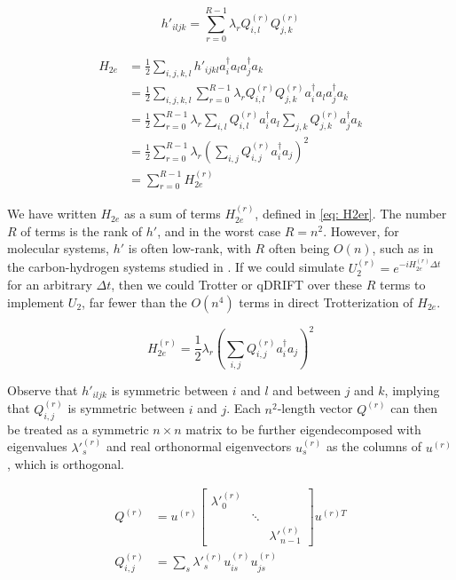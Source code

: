 \begin{equation}
    h'_{iljk} = \sum_{r = 0}^{R - 1} \lambda_r Q^{(r)}_{i, l}Q^{(r)}_{j, k}
\end{equation}

\begin{equation}
    \begin{split}
        H_{2e} &= \frac{1}{2}\sum_{i,j,k,l} h'_{ijkl}a^\dag_ia_la^\dag_ja_k \\
        &= \frac{1}{2}\sum_{i,j,k,l} \sum_{r = 0}^{R - 1} \lambda_r Q^{(r)}_{i, l}Q^{(r)}_{j, k}a^\dag_ia_la^\dag_ja_k \\
        &= \frac{1}{2}\sum_{r = 0}^{R - 1} \lambda_r \sum_{i,l} Q^{(r)}_{i, l}a^\dag_ia_l\sum_{j,k}Q^{(r)}_{j, k}a^\dag_ja_k \\
        &= \frac{1}{2}\sum_{r = 0}^{R - 1}\lambda_r\left(\sum_{i,j} Q^{(r)}_{i, j}a^\dag_ia_j\right)^2 \\
        &= \sum_{r = 0}^{R - 1} H_{2e}^{(r)}
    \end{split}
    \label{eq: DF}
\end{equation}

We have written $H_{2e}$ as a sum of terms $H_{2e}^{(r)}$, defined in \eqref{eq: H2er}. The number $R$ of terms is the rank of $h'$, and in the worst case $R = n^2$. However, for molecular systems, $h'$ is often low-rank, with $R$ often being $O(n)$, such as in the carbon-hydrogen systems studied in \cite{CH}. If we could simulate $U_2^{(r)} = e^{-iH_{2e}^{(r)}\Delta t}$ for an arbitrary $\Delta t$, then we could Trotter or qDRIFT over these $R$ terms to implement $U_2$, far fewer than the $O(n^4)$ terms in direct Trotterization of $H_{2e}$.

\begin{equation}
    H_{2e}^{(r)} = \frac{1}{2}\lambda_r\left(\sum_{i,j} Q^{(r)}_{i, j}a^\dag_ia_j\right)^2 \label{eq: H2er}
\end{equation}

Observe that $h'_{iljk}$ is symmetric between $i$ and $l$ and between $j$ and $k$, implying that $Q^{(r)}_{i, j}$ is symmetric between $i$ and $j$. Each $n^2$-length vector $Q^{(r)}$ can then be treated as a symmetric $n \times n$ matrix to be further eigendecomposed with eigenvalues $\lambda'^{(r)}_s$ and real orthonormal eigenvectors $u^{(r)}_s$ as the columns of $u^{(r)}$, which is orthogonal.

\begin{equation}
    \begin{split}
        Q^{(r)} &= u^{(r)}\begin{bmatrix}
            \lambda'^{(r)}_0 & & \\ & \ddots & \\ & & \lambda'^{(r)}_{n - 1}
          \end{bmatrix}u^{(r)T} \\
        Q^{(r)}_{i, j} &= \sum_s \lambda'^{(r)}_s u^{(r)}_{is}u^{(r)}_{js}
    \end{split}
\end{equation}

